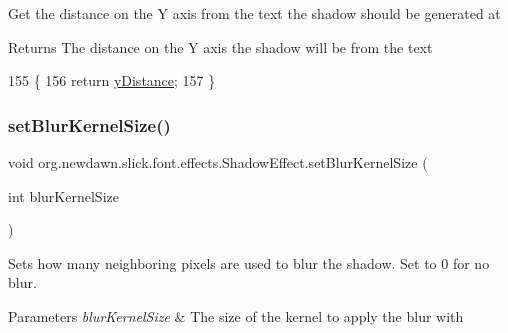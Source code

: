 Get the distance on the Y axis from the text the shadow should be generated at

\begin{DoxyReturn}{Returns}
The distance on the Y axis the shadow will be from the text 
\end{DoxyReturn}

\begin{DoxyCode}
155                                 \{
156         \textcolor{keywordflow}{return} \mbox{\hyperlink{classorg_1_1newdawn_1_1slick_1_1font_1_1effects_1_1_shadow_effect_a06d791511d507ab313c764edbde43fa8}{yDistance}};
157     \}
\end{DoxyCode}
\mbox{\label{classorg_1_1newdawn_1_1slick_1_1font_1_1effects_1_1_shadow_effect_a607b81078cab19d284242cc96c566992}} 
\subsubsection{\texorpdfstring{set\+Blur\+Kernel\+Size()}{setBlurKernelSize()}}
{\footnotesize\ttfamily void org.\+newdawn.\+slick.\+font.\+effects.\+Shadow\+Effect.\+set\+Blur\+Kernel\+Size (\begin{DoxyParamCaption}\item[{int}]{blur\+Kernel\+Size }\end{DoxyParamCaption})\hspace{0.3cm}{\ttfamily [inline]}}

Sets how many neighboring pixels are used to blur the shadow. Set to 0 for no blur.


\begin{DoxyParams}{Parameters}
{\em blur\+Kernel\+Size} & The size of the kernel to apply the blur with \\
\hline
\end{DoxyParams}

